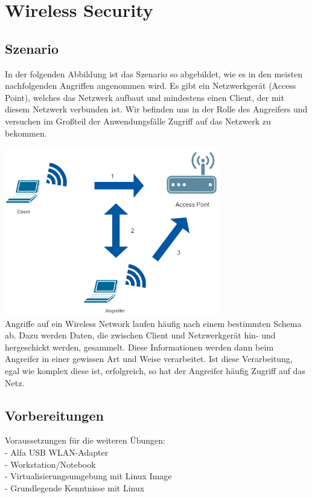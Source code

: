 \chapter{Wireless Security}

\section{Szenario}

In der folgenden Abbildung ist das Szenario so abgebildet, wie es in den meisten nachfolgenden Angriffen angenommen wird. Es gibt ein Netzwerkgerät (Access Point), welches das Netzwerk aufbaut und mindestens einen Client, der mit diesem Netzwerk verbunden ist. Wir befinden uns in der Rolle des Angreifers und versuchen im Großteil der Anwendungsfälle Zugriff auf das Netzwerk zu bekommen.

\includegraphics[width=0.7\textwidth]{bilder/wlan/WLANSzenario.png}\\

Angriffe auf ein Wireless Network laufen häufig nach einem bestimmten Schema ab. 
Dazu werden Daten, die zwischen Client und Netzwerkgerät hin- und hergeschickt werden, gesammelt. Diese Informationen werden dann beim Angreifer in einer gewissen Art und Weise verarbeitet.
Ist diese Verarbeitung, egal wie komplex diese ist, erfolgreich, so hat der Angreifer häufig Zugriff auf das Netz. 

\section{Vorbereitungen}

Voraussetzungen für die weiteren Übungen:\\

- Alfa USB WLAN-Adapter\\
- Workstation/Notebook\\
- Virtualisierungsumgebung mit Linux Image\\
- Grundlegende Kenntnisse mit Linux\\

